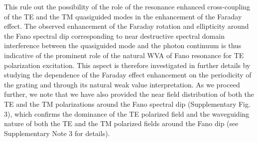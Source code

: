 \documentclass[13pt]{article}
\begin{document}
This rule out the possibility of the role of the resonance enhanced cross-coupling of the TE and the TM quasiguided modes in the enhancement of the Faraday effect. The observed enhancement of the Faraday rotation and ellipticity around the Fano spectral dip corresponding to near destructive spectral domain interference between the quasiguided mode and the photon continuum is thus indicative of the prominent role of the natural WVA of Fano resonance for TE polarization excitation. This aspect is therefore investigated in further details by studying the dependence of the Faraday effect enhancement on the periodicity of the grating and through its natural weak value interpretation. As we proceed further, we note that we have also provided the near field distribution of both the TE and the TM polarizations around the Fano spectral dip (Supplementary Fig. 3), which confirms the dominance of the TE polarized field and the waveguiding nature of both the TE and the TM polarized fields around the Fano dip (see Supplementary Note 3 for details). 
\end{document}
